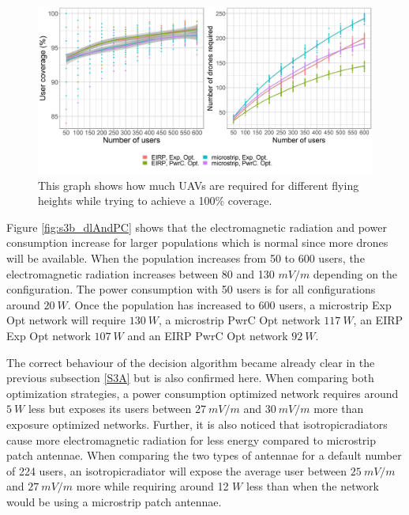 \begin{figure}[h]
  \includegraphics[width=\textwidth]{../results/s3/uvsnumdronesAndCov.png}
  \caption{This graph shows how much \acs{UAV}s are required for different flying heights while trying to achieve a 100\% coverage.}
  \label{fig:s3b_numdronesAndCov}
\end{figure}

Figure \ref{fig:s3b_dlAndPC} shows that the electromagnetic radiation and power consumption increase for larger 
populations which is normal since more drones will be available.
When the population increases from 50 to 600 users, the electromagnetic radiation increases 
between 80 and 130 $mV/m$ depending on the configuration. The power consumption with 50 users is for all configurations around 
$20\ W$. Once the population has increased to 600 users, a microstrip \gls{Exp Opt} network will require $130\ W$, 
 a microstrip \gls{PwrC Opt} network $117\ W$,
an \gls{EIRP} \gls{Exp Opt} network $107\ W$ and an \gls{EIRP} \gls{PwrC Opt} network $92\ W$.

The correct behaviour of the decision algorithm became already clear in the previous subsection \ref{S3A} but is also
confirmed here. 
When comparing both optimization strategies, a power consumption optimized network requires around $5\ W$ less but exposes its users between $27\ mV/m$ and $30\ mV/m$ more than
exposure optimized networks. 
Further, it is also noticed that \gls{isotropicradiator}s cause more electromagnetic radiation for less energy
compared to microstrip patch antennae. 
When comparing the two types of antennae for a default number of 224 users, 
an \gls{isotropicradiator} will expose the average user 
between $25\ mV/m$ and $27\ mV/m$ more while requiring around 12 $W$ less than when the network would be using a microstrip patch antennae.


